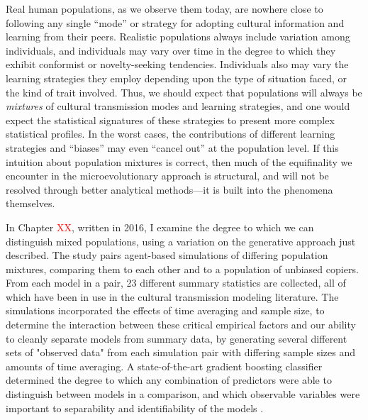 Real human populations, as we observe them today, are nowhere close to following any single ``mode'' or strategy for adopting cultural information and learning from their peers.  Realistic populations always include variation among individuals, and individuals may vary over time in the degree to which they exhibit conformist or novelty-seeking tendencies.  Individuals also may vary the learning strategies they employ depending upon the type of situation faced, or the kind of trait involved.  Thus, we should expect that populations will always be \emph{mixtures} of cultural transmission modes and learning strategies, and one would expect the statistical signatures of these strategies to present more complex statistical profiles.  In the worst cases, the contributions of different learning strategies and ``biases'' may even ``cancel out'' at the population level.  If this intuition about population mixtures is correct, then much of the equifinality we encounter in the microevolutionary approach is structural, and will not be resolved through better analytical methods---it is built into the phenomena themselves.

In Chapter \textcolor{red}{XX}, written in 2016, I examine the degree to which we can distinguish mixed populations, using a variation on the generative approach just described.  The study pairs agent-based simulations of differing population mixtures, comparing them to each other and to a population of unbiased copiers.  From each model in a pair, 23 different summary statistics are collected, all of which have been in use in the cultural transmission modeling literature.  The simulations incorporated the effects of time averaging and sample size, to determine the interaction between these critical empirical factors and our ability to cleanly separate models from summary data, by generating several different sets of "observed data" from each simulation pair with differing sample sizes and amounts of time averaging.  A state-of-the-art gradient boosting classifier determined the degree to which any combination of predictors were able to distinguish between models in a comparison, and which observable variables were important to separability and identifiability of the models \cite{AlexeyNatekin2013,Friedman2000,hastie2009elements}.  

